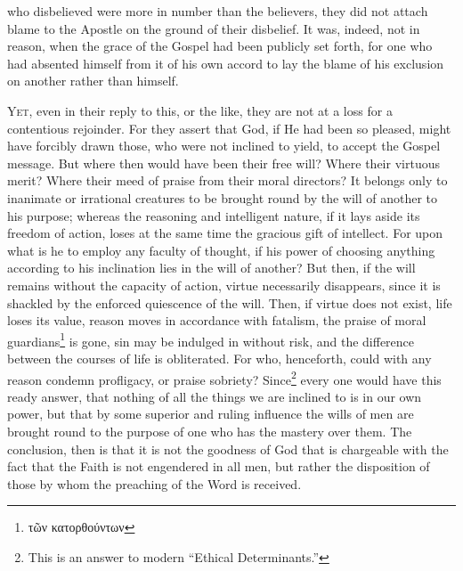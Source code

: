 who disbelieved were more in number than the believers, they did not attach blame to the Apostle on the ground of their disbelief. It was, indeed, not in reason, when the grace of the Gospel had been publicly set forth, for one who had absented himself from it of his own accord to lay the blame of his exclusion on another rather than himself.


\textsc{Yet}, even in their reply to this, or the like, they are not at a loss for a contentious rejoinder. For they assert that God, if He had been so pleased, might have forcibly drawn those, who were not inclined to yield, to accept the Gospel message. But where then would have been their free will? Where their virtuous merit? Where their meed of praise from their moral directors? It belongs only to inanimate or irrational creatures to be brought round by the will of another to his purpose; whereas the reasoning and intelligent nature, if it lays aside its freedom of action, loses at the same time the gracious gift of intellect. For upon what is he to employ any faculty of thought, if his power of choosing anything according to his inclination lies in the will of another? But then, if the will remains without the capacity of action, virtue necessarily disappears, since it is shackled by the enforced quiescence of the will. Then, if virtue does not exist, life loses its value, reason moves in accordance with fatalism, the praise of moral guardians\footnote{\textgreek{τῶν κατορθούντων}} is gone, sin may be indulged in without risk, and the difference between the courses of life is obliterated. For who, henceforth, could with any reason condemn profligacy, or praise sobriety? Since\footnote{This is an answer to modern “Ethical Determinants.”} every one would have this ready answer, that nothing of all the things we are inclined to is in our own power, but that by some superior and ruling influence the wills of men are brought round to the purpose of one who has the mastery over them. The conclusion, then is that it is not the goodness of God that is chargeable with the fact that the Faith is not engendered in all men, but rather the disposition of those by whom the preaching of the Word is received.


